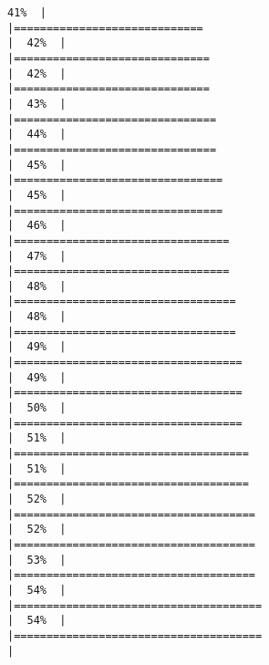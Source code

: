 \documentclass[
]{book}
\begin{document}
\begin{verbatim}
41%  |                                                                              |=============================                                         |  42%  |                                                                              |==============================                                        |  42%  |                                                                              |==============================                                        |  43%  |                                                                              |===============================                                       |  44%  |                                                                              |===============================                                       |  45%  |                                                                              |================================                                      |  45%  |                                                                              |================================                                      |  46%  |                                                                              |=================================                                     |  47%  |                                                                              |=================================                                     |  48%  |                                                                              |==================================                                    |  48%  |                                                                              |==================================                                    |  49%  |                                                                              |===================================                                   |  49%  |                                                                              |===================================                                   |  50%  |                                                                              |===================================                                   |  51%  |                                                                              |====================================                                  |  51%  |                                                                              |====================================                                  |  52%  |                                                                              |=====================================                                 |  52%  |                                                                              |=====================================                                 |  53%  |                                                                              |=====================================                                 |  54%  |                                                                              |======================================                                |  54%  |                                                                              |======================================                                |  
\end{verbatim}
\end{document}
